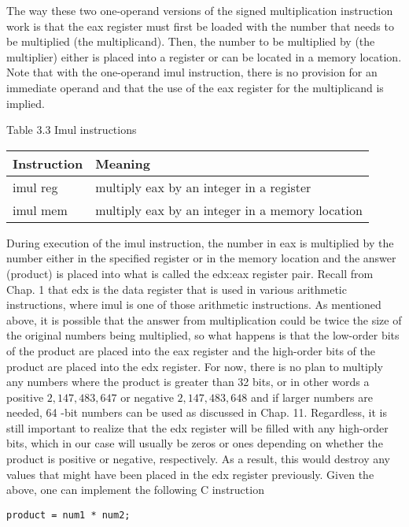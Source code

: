 \documentclass[10pt]{article}
\begin{document}
The way these two one-operand versions of the signed multiplication instruction work is that the eax register must first be loaded with the number that needs to be multiplied (the multiplicand). Then, the number to be multiplied by (the multiplier) either is placed into a register or can be located in a memory location. Note that with the one-operand imul instruction, there is no provision for an immediate operand and that the use of the eax register for the multiplicand is implied.

Table 3.3 Imul instructions

\begin{center}
\begin{tabular}{|l|l|}
\hline
Instruction & Meaning \\
\hline
imul reg & multiply eax by an integer in a register \\
\hline
imul mem & multiply eax by an integer in a memory location \\
\hline
\end{tabular}
\end{center}

During execution of the imul instruction, the number in eax is multiplied by the number either in the specified register or in the memory location and the answer (product) is placed into what is called the edx:eax register pair. Recall from Chap. 1 that edx is the data register that is used in various arithmetic instructions, where imul is one of those arithmetic instructions. As mentioned above, it is possible that the answer from multiplication could be twice the size of the original numbers being multiplied, so what happens is that the low-order bits of the product are placed into the eax register and the high-order bits of the product are placed into the edx register. For now, there is no plan to multiply any numbers where the product is greater than 32 bits, or in other words a positive $2,147,483,647$ or negative $2,147,483,648$ and if larger numbers are needed, 64 -bit numbers can be used as discussed in Chap. 11. Regardless, it is still important to realize that the edx register will be filled with any high-order bits, which in our case will usually be zeros or ones depending on whether the product is positive or negative, respectively. As a result, this would destroy any values that might have been placed in the edx register previously. Given the above, one can implement the following C instruction

\begin{verbatim}
product = num1 * num2;
\end{verbatim}
\end{document}
